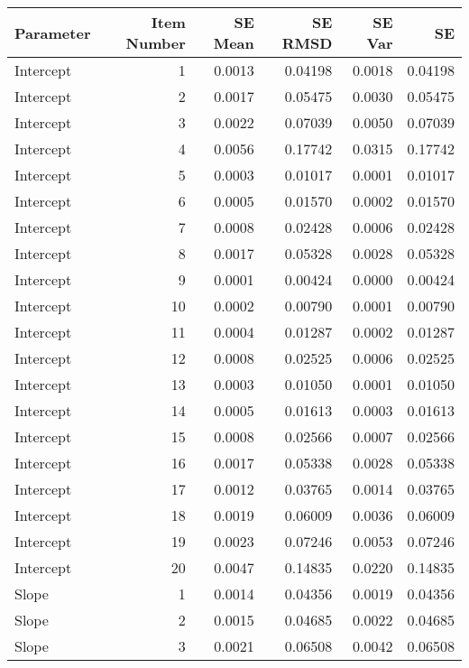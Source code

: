 \begin{table}[H]
\centering
\begin{tabular}{lrrrrr}
  \hline
Parameter & Item Number & SE Mean & SE RMSD & SE Var & SE \\ 
  \hline
Intercept &   1 & 0.0013 & 0.04198 & 0.0018 & 0.04198 \\ 
  Intercept &   2 & 0.0017 & 0.05475 & 0.0030 & 0.05475 \\ 
  Intercept &   3 & 0.0022 & 0.07039 & 0.0050 & 0.07039 \\ 
  Intercept &   4 & 0.0056 & 0.17742 & 0.0315 & 0.17742 \\ 
  Intercept &   5 & 0.0003 & 0.01017 & 0.0001 & 0.01017 \\ 
  Intercept &   6 & 0.0005 & 0.01570 & 0.0002 & 0.01570 \\ 
  Intercept &   7 & 0.0008 & 0.02428 & 0.0006 & 0.02428 \\ 
  Intercept &   8 & 0.0017 & 0.05328 & 0.0028 & 0.05328 \\ 
  Intercept &   9 & 0.0001 & 0.00424 & 0.0000 & 0.00424 \\ 
  Intercept &  10 & 0.0002 & 0.00790 & 0.0001 & 0.00790 \\ 
  Intercept &  11 & 0.0004 & 0.01287 & 0.0002 & 0.01287 \\ 
  Intercept &  12 & 0.0008 & 0.02525 & 0.0006 & 0.02525 \\ 
  Intercept &  13 & 0.0003 & 0.01050 & 0.0001 & 0.01050 \\ 
  Intercept &  14 & 0.0005 & 0.01613 & 0.0003 & 0.01613 \\ 
  Intercept &  15 & 0.0008 & 0.02566 & 0.0007 & 0.02566 \\ 
  Intercept &  16 & 0.0017 & 0.05338 & 0.0028 & 0.05338 \\ 
  Intercept &  17 & 0.0012 & 0.03765 & 0.0014 & 0.03765 \\ 
  Intercept &  18 & 0.0019 & 0.06009 & 0.0036 & 0.06009 \\ 
  Intercept &  19 & 0.0023 & 0.07246 & 0.0053 & 0.07246 \\ 
  Intercept &  20 & 0.0047 & 0.14835 & 0.0220 & 0.14835 \\ 
  Slope &   1 & 0.0014 & 0.04356 & 0.0019 & 0.04356 \\ 
  Slope &   2 & 0.0015 & 0.04685 & 0.0022 & 0.04685 \\ 
  Slope &   3 & 0.0021 & 0.06508 & 0.0042 & 0.06508 \\ 

\end{tabular}
\end{table}
